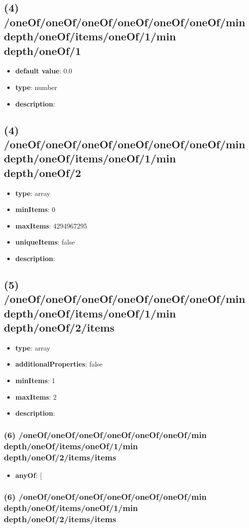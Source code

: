 \subsection{(4) /oneOf/oneOf/oneOf/oneOf/oneOf/oneOf/min depth/oneOf/items/oneOf/1/min depth/oneOf/1}
\begin{itemize}[leftmargin=4em]\item {\bf default value}: 0.0
\item {\bf type}: number
\item {\bf description}: 
\end{itemize}\subsection{(4) /oneOf/oneOf/oneOf/oneOf/oneOf/oneOf/min depth/oneOf/items/oneOf/1/min depth/oneOf/2}
\begin{itemize}[leftmargin=4em]\item {\bf type}: array
\item {\bf minItems}: 0
\item {\bf maxItems}: 4294967295
\item {\bf uniqueItems}: false
\item {\bf description}: 
\end{itemize}\subsection{(5) /oneOf/oneOf/oneOf/oneOf/oneOf/oneOf/min depth/oneOf/items/oneOf/1/min depth/oneOf/2/items}
\begin{itemize}[leftmargin=5em]\item {\bf type}: array
\item {\bf additionalProperties}: false
\item {\bf minItems}: 1
\item {\bf maxItems}: 2
\item {\bf description}: 
\end{itemize}\subsubsection{(6) /oneOf/oneOf/oneOf/oneOf/oneOf/oneOf/min depth/oneOf/items/oneOf/1/min depth/oneOf/2/items/items}
\begin{itemize}[leftmargin=6em]\item {\bf anyOf}: [\end{itemize}\subsubsection{(6) /oneOf/oneOf/oneOf/oneOf/oneOf/oneOf/min depth/oneOf/items/oneOf/1/min depth/oneOf/2/items/items}
